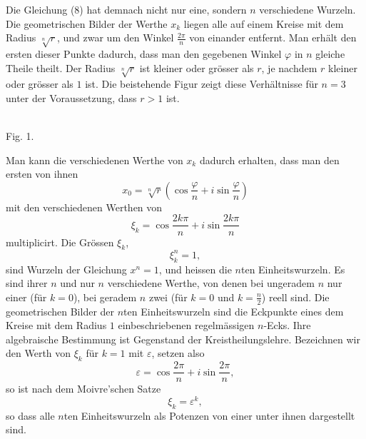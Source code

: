 \documentclass[11pt]{article}
\begin{document}
Die Gleichung (8) hat demnach nicht nur eine, sondern $n$ verschiedene Wurzeln. Die geometrischen Bilder der Werthe $x_k$ liegen alle auf einem Kreise mit dem Radius $\sqrt[n]{r}$, und zwar um den Winkel $\frac{2\pi}{n}$ von einander entfernt. Man erhält den ersten dieser Punkte dadurch, dass man den gegebenen Winkel $\varphi$ in $n$ gleiche Theile theilt. Der Radius $\sqrt[n]{r}$ ist kleiner oder grösser als $r$, je nachdem $r$ kleiner oder grösser als $1$ ist. Die beistehende Figur zeigt diese Verhältnisse für $n=3$ unter der Voraussetzung, dass $r>1$ ist.


\begin{center}
\\[-0.2em]
{\small Fig. 1.}
\end{center}


Man kann die verschiedenen Werthe von $x_k$ dadurch erhalten, dass man den ersten von ihnen
\[
 x_0=\sqrt[n]{r}\left(\cos\frac{\varphi}{n}+i\sin\frac{\varphi}{n}\right)
\]
mit den verschiedenen Werthen von
\begin{equation}
 \xi_k=\cos\frac{2k\pi}{n}+i\sin\frac{2k\pi}{n}
\tag{11}
\end{equation}
multiplicirt. Die Grössen $\xi_k$,
\begin{equation}
 \xi_k^n=1,
\tag{12}
\end{equation}
sind Wurzeln der Gleichung $x^n=1$, und heissen die $n$ten Einheitswurzeln. Es sind ihrer $n$ und nur $n$ verschiedene Werthe, von denen bei ungeradem $n$ nur einer (für $k=0$), bei geradem $n$ zwei (für $k=0$ und $k=\frac n2$) reell sind. Die geometrischen Bilder der $n$ten Einheitswurzeln sind die Eckpunkte eines dem Kreise mit dem Radius $1$ einbeschriebenen regelmässigen $n$-Ecks. Ihre algebraische Bestimmung ist Gegenstand der Kreistheilungslehre. Bezeichnen wir den Werth von $\xi_k$ für $k=1$ mit $\varepsilon$, setzen also
\[
 \varepsilon=\cos\frac{2\pi}{n}+i\sin\frac{2\pi}{n},
\]
so ist nach dem Moivre'schen Satze
\[
 \xi_k=\varepsilon^k,
\]
so dass alle $n$ten Einheitswurzeln als Potenzen von einer unter ihnen dargestellt sind.
\end{document}
